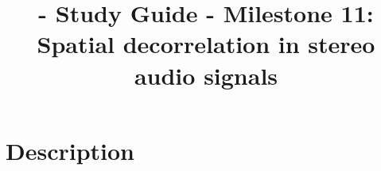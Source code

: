 
\title{\TM{} - Study Guide - Milestone 11: Spatial decorrelation in stereo audio signals}

\maketitle

\section{Description}

\begin{comment}
Unfortunately, this
estatement is only true if the
\href{https://en.wikipedia.org/wiki/Entropy_encoding}{entropy coding}
stage generates the same number of bits for both subbands, something
that rarely happens because we are compressing the coefficients of the
subbands considering the complete chunk (remember that we are
exploiting the
\href{https://en.wikipedia.org/wiki/Correlation_and_dependence}{statistical
  correlation} between the sequence of coefficients generated by all
the frames of a chunk). In general, the amount of information provided
by each subband $w_i$ is different, and therefore, the discrete
\href{https://en.wikipedia.org/wiki/Rate%E2%80%93distortion_theory}{Rate
  Distortion} (RD) curve\footnote{A discrete RD curve is defined by
the
\href{https://en.wikipedia.org/wiki/Multi-objective_optimization}{Pareto
  front} form by the RD points.} generated by each subband is distint.

The standard solution for this problem is to select a $\Delta_i$ value
for each $w_i$ that select RD points with the same RD
\href{https://en.wikipedia.org/wiki/Slope}{slope}~\cite{vetterli2014foundations,sayood2017introduction}.
A RD point is defined as a pair or $(r,d)$ values where $r$ represents
a bit-rate (typically expressed in bits/sample) and $d$ represents a
distortion (that uses to be the
\href{https://en.wikipedia.org/wiki/Root-mean-square_deviation}{RMSE}
when we use the L$_2$ norm to measure distances). Therefore, to find
the two RD curves for the current chunk, we should apply the stereo
transform, use a set of quantization steps to each subband, and
compress the resulting quantization indexes for each quantization
step. This would find the $r$ values of our RD curve. Then,
decompress, dequantize and find the distortion for the chunk. This
would find the $d$ values. Finally, with this RD curve, we should
select the $\Delta_i$ values that provides the same slope for both
subbands.


\end{comment}
